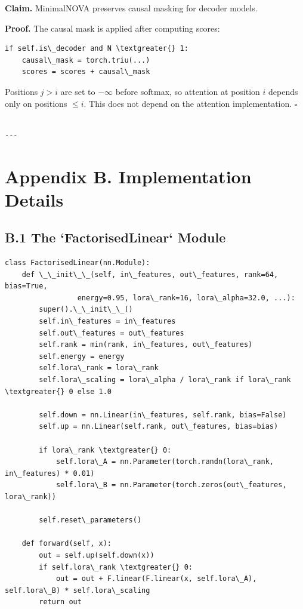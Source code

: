 \textbf{Claim.} MinimalNOVA preserves causal masking for decoder models.

\textbf{Proof.} The causal mask is applied after computing scores:

\begin{lstlisting}
if self.is\_decoder and N \textgreater{} 1:
    causal\_mask = torch.triu(...)
    scores = scores + causal\_mask
\end{lstlisting}

Positions $j > i$ are set to $-\infty$ before softmax, so attention at 
position $i$ depends only on positions $\leq i$. This does not depend on the 
attention implementation. $\square$
\begin{lstlisting}

---
\end{lstlisting}


\section{Appendix B. Implementation Details}

\subsection{B.1 The `FactorisedLinear` Module}

\begin{lstlisting}
class FactorisedLinear(nn.Module):
    def \_\_init\_\_(self, in\_features, out\_features, rank=64, bias=True,
                 energy=0.95, lora\_rank=16, lora\_alpha=32.0, ...):
        super().\_\_init\_\_()
        self.in\_features = in\_features
        self.out\_features = out\_features
        self.rank = min(rank, in\_features, out\_features)
        self.energy = energy
        self.lora\_rank = lora\_rank
        self.lora\_scaling = lora\_alpha / lora\_rank if lora\_rank \textgreater{} 0 else 1.0
        
        self.down = nn.Linear(in\_features, self.rank, bias=False)
        self.up = nn.Linear(self.rank, out\_features, bias=bias)
        
        if lora\_rank \textgreater{} 0:
            self.lora\_A = nn.Parameter(torch.randn(lora\_rank, in\_features) * 0.01)
            self.lora\_B = nn.Parameter(torch.zeros(out\_features, lora\_rank))
        
        self.reset\_parameters()
    
    def forward(self, x):
        out = self.up(self.down(x))
        if self.lora\_rank \textgreater{} 0:
            out = out + F.linear(F.linear(x, self.lora\_A), self.lora\_B) * self.lora\_scaling
        return out
\end{lstlisting}

